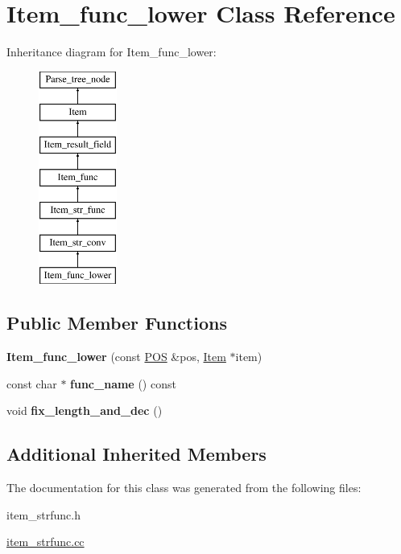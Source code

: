 \hypertarget{classItem__func__lower}{}\section{Item\+\_\+func\+\_\+lower Class Reference}
\label{classItem__func__lower}
Inheritance diagram for Item\+\_\+func\+\_\+lower\+:\begin{figure}[H]
\begin{center}
\leavevmode
\includegraphics[height=7.000000cm]{classItem__func__lower}
\end{center}
\end{figure}
\subsection*{Public Member Functions}
\begin{DoxyCompactItemize}
\item 
\mbox{\label{classItem__func__lower_a3d12ec514751a1b04cdd69dcfc73dc32}} 
{\bfseries Item\+\_\+func\+\_\+lower} (const \mbox{\hyperlink{structYYLTYPE}{P\+OS}} \&pos, \mbox{\hyperlink{classItem}{Item}} $\ast$item)
\item 
\mbox{\label{classItem__func__lower_af36e55d40c80b328d9577b9d5df21704}} 
const char $\ast$ {\bfseries func\+\_\+name} () const
\item 
\mbox{\label{classItem__func__lower_ad3304db7826103c75bee71dba6c939d5}} 
void {\bfseries fix\+\_\+length\+\_\+and\+\_\+dec} ()
\end{DoxyCompactItemize}
\subsection*{Additional Inherited Members}


The documentation for this class was generated from the following files\+:\begin{DoxyCompactItemize}
\item 
item\+\_\+strfunc.\+h\item 
\mbox{\hyperlink{item__strfunc_8cc}{item\+\_\+strfunc.\+cc}}\end{DoxyCompactItemize}
